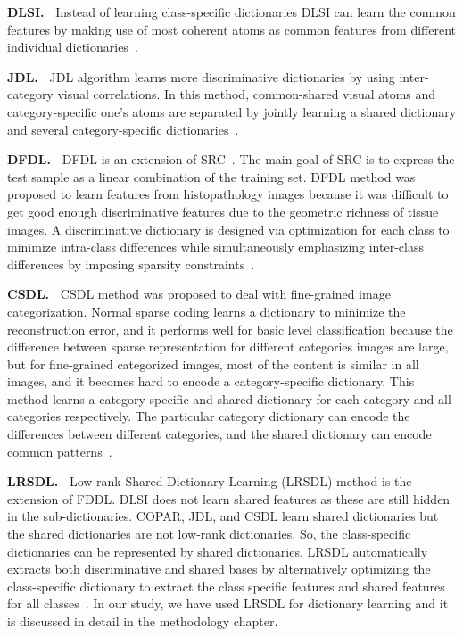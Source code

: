 \noindent
\textbf{DLSI.~}
Instead of learning class-specific dictionaries DLSI can learn the common features by making use of most coherent atoms as common features from different individual dictionaries~\cite{ramirez2010classification}.%
 
\noindent
\textbf{JDL.~}
JDL algorithm learns more discriminative dictionaries by using inter-category visual correlations. In this method, common-shared visual atoms and category-specific one's atoms are separated by jointly learning a shared dictionary and several category-specific dictionaries~\cite{zhou2014jointly}.%

\noindent
\textbf{DFDL.~}
DFDL is an extension of SRC~\cite{wright2009robust}. The main goal of SRC is to express the test sample as a linear combination of the training set. DFDL method was proposed to learn features from histopathology images because it was difficult to get good enough discriminative features due to the geometric richness of tissue images.  A discriminative dictionary is designed via optimization for each class to minimize intra-class differences while simultaneously emphasizing inter-class differences by imposing sparsity constraints~\cite{vu2015dfdl}.%

\noindent
\textbf{CSDL.~}
CSDL method was proposed to deal with fine-grained image categorization. Normal sparse coding learns a dictionary to minimize the reconstruction error, and it performs well for basic level classification because the difference between sparse representation for different categories images are large, but for fine-grained categorized images, most of the content is similar in all images, and it becomes hard to encode a category-specific dictionary. This method learns a category-specific and shared dictionary for each category and all categories respectively. The particular category dictionary can encode the differences between different categories, and the shared dictionary can encode common patterns~\cite{gao2014learning}.%

\noindent
\textbf{LRSDL.~}
Low-rank Shared Dictionary Learning (LRSDL) method is the extension of FDDL. DLSI does not learn shared features as these are still hidden in the sub-dictionaries. COPAR, JDL, and CSDL learn shared dictionaries but the shared dictionaries are not low-rank dictionaries. So, the class-specific dictionaries can be represented by shared dictionaries. LRSDL automatically extracts both discriminative and shared bases by alternatively optimizing the class-specific dictionary to extract the class specific features and shared features for all classes~\cite{7987024}. In our study, we have used LRSDL for dictionary learning and it is discussed in detail in the methodology chapter.

